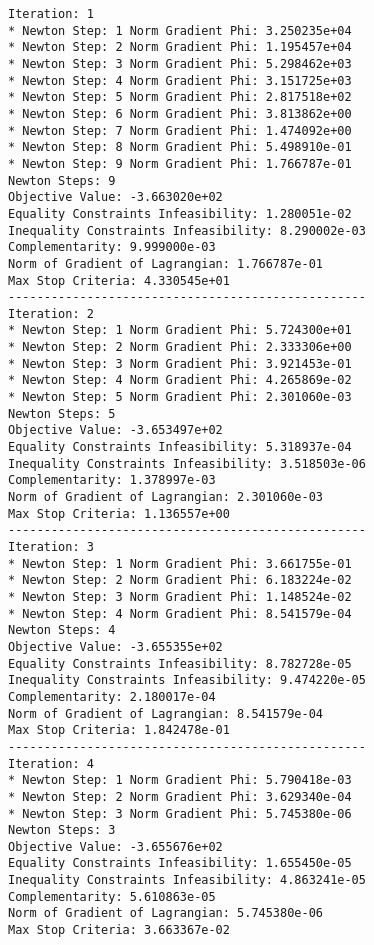 \documentclass{article}
\begin{document}
\scriptsize
\begin{minipage}[t]{0.45\textwidth}
\begin{verbatim}
Iteration: 1
* Newton Step: 1 Norm Gradient Phi: 3.250235e+04
* Newton Step: 2 Norm Gradient Phi: 1.195457e+04
* Newton Step: 3 Norm Gradient Phi: 5.298462e+03
* Newton Step: 4 Norm Gradient Phi: 3.151725e+03
* Newton Step: 5 Norm Gradient Phi: 2.817518e+02
* Newton Step: 6 Norm Gradient Phi: 3.813862e+00
* Newton Step: 7 Norm Gradient Phi: 1.474092e+00
* Newton Step: 8 Norm Gradient Phi: 5.498910e-01
* Newton Step: 9 Norm Gradient Phi: 1.766787e-01
Newton Steps: 9
Objective Value: -3.663020e+02
Equality Constraints Infeasibility: 1.280051e-02
Inequality Constraints Infeasibility: 8.290002e-03
Complementarity: 9.999000e-03
Norm of Gradient of Lagrangian: 1.766787e-01
Max Stop Criteria: 4.330545e+01
--------------------------------------------------
Iteration: 2
* Newton Step: 1 Norm Gradient Phi: 5.724300e+01
* Newton Step: 2 Norm Gradient Phi: 2.333306e+00
* Newton Step: 3 Norm Gradient Phi: 3.921453e-01
* Newton Step: 4 Norm Gradient Phi: 4.265869e-02
* Newton Step: 5 Norm Gradient Phi: 2.301060e-03
Newton Steps: 5
Objective Value: -3.653497e+02
Equality Constraints Infeasibility: 5.318937e-04
Inequality Constraints Infeasibility: 3.518503e-06
Complementarity: 1.378997e-03
Norm of Gradient of Lagrangian: 2.301060e-03
Max Stop Criteria: 1.136557e+00
--------------------------------------------------
Iteration: 3
* Newton Step: 1 Norm Gradient Phi: 3.661755e-01
* Newton Step: 2 Norm Gradient Phi: 6.183224e-02
* Newton Step: 3 Norm Gradient Phi: 1.148524e-02
* Newton Step: 4 Norm Gradient Phi: 8.541579e-04
Newton Steps: 4
Objective Value: -3.655355e+02
Equality Constraints Infeasibility: 8.782728e-05
Inequality Constraints Infeasibility: 9.474220e-05
Complementarity: 2.180017e-04
Norm of Gradient of Lagrangian: 8.541579e-04
Max Stop Criteria: 1.842478e-01
--------------------------------------------------
Iteration: 4
* Newton Step: 1 Norm Gradient Phi: 5.790418e-03
* Newton Step: 2 Norm Gradient Phi: 3.629340e-04
* Newton Step: 3 Norm Gradient Phi: 5.745380e-06
Newton Steps: 3
Objective Value: -3.655676e+02
Equality Constraints Infeasibility: 1.655450e-05
Inequality Constraints Infeasibility: 4.863241e-05
Complementarity: 5.610863e-05
Norm of Gradient of Lagrangian: 5.745380e-06
Max Stop Criteria: 3.663367e-02
\end{verbatim}
\end{minipage}
\end{document}
